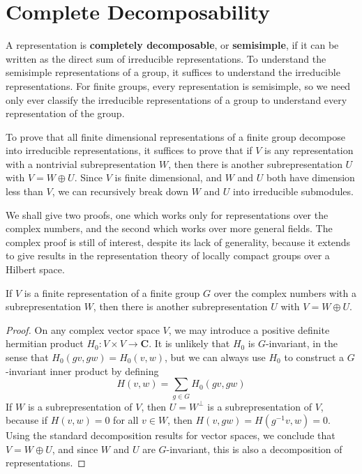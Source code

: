 \section{Complete Decomposability}

A representation is {\bf completely decomposable}, or {\bf semisimple}, if it can be written as the direct sum of irreducible representations. To understand the semisimple representations of a group, it suffices to understand the irreducible representations. For finite groups, every representation is semisimple, so we need only ever classify the irreducible representations of a group to understand every representation of the group.

To prove that all finite dimensional representations of a finite group decompose into irreducible representations, it suffices to prove that if $V$ is any representation with a nontrivial subrepresentation $W$, then there is another subrepresentation $U$ with $V = W \oplus U$. Since $V$ is finite dimensional, and $W$ and $U$ both have dimension less than $V$, we can recursively break down $W$ and $U$ into irreducible submodules.

We shall give two proofs, one which works only for representations over the complex numbers, and the second which works over more general fields. The complex proof is still of interest, despite its lack of generality, because it extends to give results in the representation theory of locally compact groups over a Hilbert space.

\begin{theorem}
    If $V$ is a finite representation of a finite group $G$ over the complex numbers with a subrepresentation $W$, then there is another subrepresentation $U$ with $V = W \oplus U$.
\end{theorem}
\begin{proof}
    On any complex vector space $V$, we may introduce a positive definite hermitian product $H_0: V \times V \to \mathbf{C}$. It is unlikely that $H_0$ is $G$-invariant, in the sense that $H_0(gv,gw) = H_0(v,w)$, but we can always use $H_0$ to construct a $G$-invariant inner product by defining
    \[ H(v,w) = \sum_{g \in G} H_0(gv,gw) \]
    If $W$ is a subrepresentation of $V$, then $U = W^\perp$ is a subrepresentation of $V$, because if $H(v,w) = 0$ for all $v \in W$, then $H(v,gw) = H(g^{-1}v, w) = 0$. Using the standard decomposition results for vector spaces, we conclude that $V = W \oplus U$, and since $W$ and $U$ are $G$-invariant, this is also a decomposition of representations.
\end{proof}

